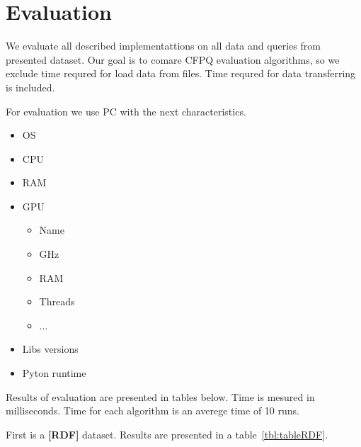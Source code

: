 \section{Evaluation}

We evaluate all described implementattions on all data and queries from presented dataset.
Our goal is to comare CFPQ evaluation algorithms, so we exclude time requred for load data from files.
Time requred for data transferring is included.

For evaluation we use PC with the next characteristics.
\begin{itemize}
  \item OS
  \item CPU
  \item RAM
  \item GPU
   \begin{itemize}
    \item Name
    \item GHz
    \item RAM
    \item Threads
    \item ...
   \end{itemize}
  \item Libs versions
  \item Pyton runtime
\end{itemize}


Results of evaluation are presented in tables below.
Time is mesured in milliseconds.
Time for each algorithm is an averege time of 10 runs.

First is a \textbf{[RDF]} dataset.
Results are presented in a table~\ref{tbl:tableRDF}.

